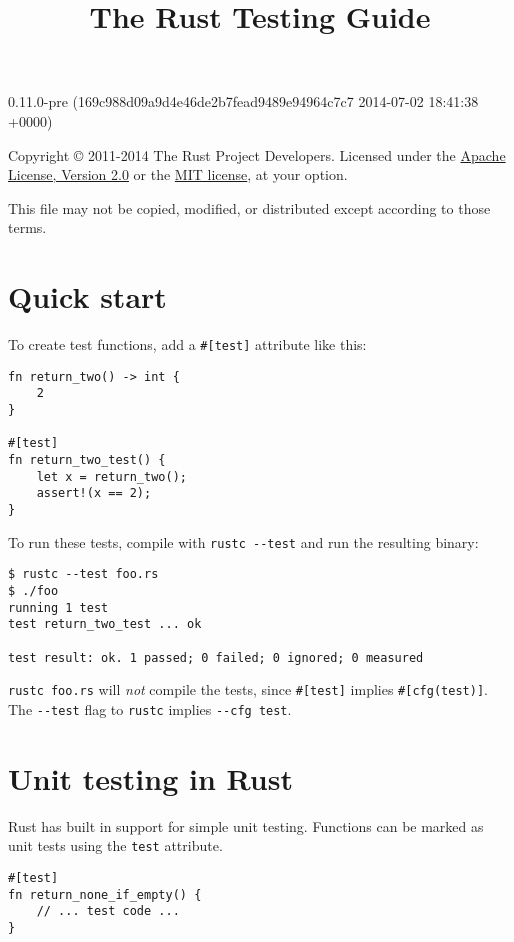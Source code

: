 \documentclass[]{article}
\title{The Rust Testing Guide}
\begin{document}
\maketitle

0.11.0-pre (169c988d09a9d4e46de2b7fead9489e94964c7c7 2014-07-02 18:41:38 +0000)

Copyright © 2011-2014 The Rust Project Developers. Licensed under the
\href{http://www.apache.org/licenses/LICENSE-2.0}{Apache License,
Version 2.0} or the \href{http://opensource.org/licenses/MIT}{MIT
license}, at your option.

This file may not be copied, modified, or distributed except according
to those terms.

{
\hypersetup{linkcolor=black}
\setcounter{tocdepth}{3}
\tableofcontents
}
\section{Quick start}\label{quick-start}

To create test functions, add a \texttt{\#{[}test{]}} attribute like
this:

\begin{verbatim}
fn return_two() -> int {
    2
}

#[test]
fn return_two_test() {
    let x = return_two();
    assert!(x == 2);
}
\end{verbatim}

To run these tests, compile with \texttt{rustc -\/-test} and run the
resulting binary:

\begin{verbatim}
$ rustc --test foo.rs
$ ./foo
running 1 test
test return_two_test ... ok

test result: ok. 1 passed; 0 failed; 0 ignored; 0 measured
\end{verbatim}

\texttt{rustc foo.rs} will \emph{not} compile the tests, since
\texttt{\#{[}test{]}} implies \texttt{\#{[}cfg(test){]}}. The
\texttt{-\/-test} flag to \texttt{rustc} implies \texttt{-\/-cfg test}.

\section{Unit testing in Rust}\label{unit-testing-in-rust}

Rust has built in support for simple unit testing. Functions can be
marked as unit tests using the \texttt{test} attribute.

\begin{verbatim}
#[test]
fn return_none_if_empty() {
    // ... test code ...
}
\end{verbatim}
\end{document}
